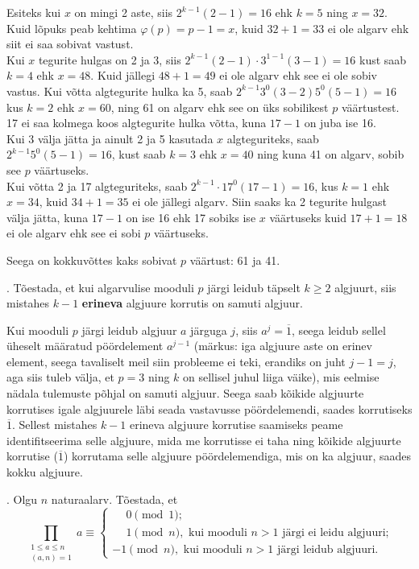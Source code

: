 \documentclass[a4paper, 10pt]{article}
\newcommand{\w}{\overline}
\begin{document}
Esiteks kui $x$ on mingi 2 aste, siis $2^{k-1}(2-1)=16$ ehk $k=5$ ning $x=32$. Kuid lõpuks peab kehtima $\varphi(p)=p-1=x$, kuid $32+1=33$ ei ole algarv ehk siit ei saa sobivat vastust.\\
Kui $x$ tegurite hulgas on 2 ja 3, siis $2^{k-1}(2-1)\cdot3^{1-1}(3-1)=16$ kust saab $k=4$ ehk $x=48$. Kuid jällegi $48+1=49$ ei ole algarv ehk see ei ole sobiv vastus. Kui võtta algtegurite hulka ka 5, saab $2^{k-1}3^0(3-2)5^0(5-1)=16$ kus $k=2$ ehk $x=60$, ning 61 on algarv ehk see on üks sobilikest $p$ väärtustest. 17 ei saa kolmega koos algtegurite hulka võtta, kuna $17-1$ on juba ise 16.\\
Kui 3 välja jätta ja ainult 2 ja 5 kasutada $x$ algteguriteks, saab $2^{k-1}5^0(5-1)=16$, kust saab $k=3$ ehk $x=40$ ning kuna 41 on algarv, sobib see $p$ väärtuseks.\\
Kui võtta 2 ja 17 algteguriteks, saab $2^{k-1}\cdot17^0(17-1)=16$, kus $k=1$ ehk $x=34$, kuid $34+1=35$ ei ole jällegi algarv. Siin saaks ka 2 tegurite hulgast välja jätta, kuna $17-1$ on ise 16 ehk 17 sobiks ise $x$ väärtuseks kuid $17+1=18$ ei ole algarv ehk see ei sobi $p$ väärtuseks.

Seega on kokkuvõttes kaks sobivat $p$ väärtust: 61 ja 41. 
\bigskip

. Tõestada, et kui algarvulise mooduli $p$ järgi leidub täpselt $k\geq 2$ algjuurt, siis mistahes $k-1$ {\bf erineva} algjuure korrutis on samuti algjuur. 

\bigskip
Kui mooduli $p$ järgi leidub algjuur $a$ järguga $j$, siis $a^j=\w{1}$, seega leidub sellel üheselt määratud pöördelement $a^{j-1}$ (märkus: iga algjuure aste on erinev element, seega tavaliselt meil siin probleeme ei teki, erandiks on juht $j-1=j$, aga siis tuleb välja, et $p=3$ ning $k$ on sellisel juhul liiga väike), mis eelmise nädala tulemuste põhjal on samuti algjuur. Seega saab kõikide algjuurte korrutises igale algjuurele läbi seada vastavusse pöördelemendi, saades korrutiseks $\w{1}$. Sellest mistahes $k-1$ erineva algjuure korrutise saamiseks peame identifitseerima selle algjuure, mida me korrutisse ei taha ning kõikide algjuurte korrutise ($\w{1}$) korrutama selle algjuure pöördelemendiga, mis on ka algjuur, saades kokku algjuure.
\bigskip
\pagebreak

. Olgu $n$ naturaalarv. Tõestada, et $$\prod\limits_{\substack{1\leq a \leq n\\(a,n)=1}}a\equiv\begin{cases}
\phantom{-}0\pmod{1};\\
\phantom{-}1\pmod{n},\text{ kui mooduli }n>1 \text{ järgi ei leidu algjuuri;}\\
-1\pmod{n},\text{ kui mooduli }n>1 \text{ järgi leidub algjuuri.}
\end{cases}$$
\end{document}
